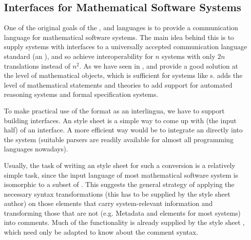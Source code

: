\begin{omgroup}[id=transform-xsl,short=Transforming OMDoc]
\section[Interfaces for Systems]{{\omdoc} Interfaces for Mathematical Software Systems}\label{sec:omdoctosys}
  One of the original goals of the {\openmath}, {\cmathml} and {\omdoc} languages is to
  provide a communication language for mathematical software systems. The main idea behind
  this is to supply systems with interfaces to a universally accepted communication
  language standard (an {}), and so achieve interoperability for $n$
  systems with only $2n$ translations instead of $n^2$. As we have seen in
  {}, {\openmath} and {\cmathml} provide a good solution at the
  level of mathematical objects, which is sufficient for systems like {s}. {\omdoc} adds the level of mathematical statements and theories
  to add support for automated reasoning systems and formal specification systems.

To make practical use of the {\omdoc} format as an interlingua, we have to support
building {\omdoc} interfaces. An {\xslt} style sheet is a simple way to come up with (the
input half) of an {\omdoc} interface.  A more efficient way would be to integrate an
{\xml} directly into the system (suitable {\xml} parsers are readily
available for almost all programming languages nowadays).

Usually, the task of writing an {\xslt} style sheet for such a conversion is a
relatively simple task, since the input language of most mathematical software
system is isomorphic to a subset of {\omdoc}. This suggests the general strategy
of applying the necessary syntax transformations (this has to be supplied by the
style sheet author) on those {\omdoc} elements that carry system-relevant
information and transforming those that are not (e.g. Metadata and {}
elements for most systems) into comments.  Much of the functionality is already
supplied by the style sheet {}, which need only be adapted to
know about the comment syntax. 


\end{omgroup}
